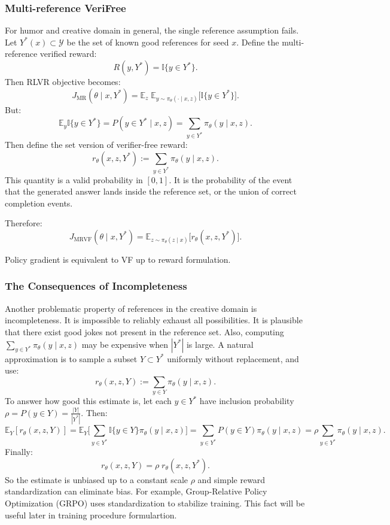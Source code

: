 \documentclass[12pt]{extarticle}
\begin{document}
\subsubsection{Multi-reference VeriFree}
For humor and creative domain in general, the single reference assumption fails. Let \(Y^{*}(x)\subset \mathcal{Y}\) be the set of known good references for seed \(x\). Define the multi-reference verified reward:
\[
  R(y, Y^{*}) = \mathbb{I}\{y\in Y^{*}\}.
\]
Then RLVR objective becomes:
\[
  J_{\text{MR}}(\theta\mid x,Y^{*}) = \mathbb{E}_{z}\;\mathbb{E}_{y\sim\pi_\theta(\cdot\mid x,z)}\big[\mathbb{I}\{y\in Y^{*}\}\big].
\]
But:
\[
  \mathbb{E}_{y}\mathbb{I}\{y\in Y^{*}\} = P(y\in Y^{*}\mid x,z)=\sum_{y\in Y^{*}}\pi_\theta(y\mid x,z).
\]
Then define the set version of verifier-free reward:
\[
  r_\theta(x,z,Y^{*}) := \sum_{y\in Y^{*}}\pi_\theta(y\mid x,z).
\]
This quantity is a valid probability in \([0,1]\). It is the probability of the event that the generated answer lands inside the reference set, or the union of correct completion events.

Therefore:
\[
  J_{\text{MRVF}}(\theta\mid x,Y^{*})=\mathbb{E}_{z\sim\pi_\theta(z\mid x)}\big[r_\theta(x,z,Y^{*})\big].
\]

Policy gradient is equivalent to VF up to reward formulation.

\subsubsection{The Consequences of Incompleteness}
Another problematic property of references in the creative domain is incompleteness. It is impossible to reliably exhaust all possibilities. It is plausible that there exist good jokes not present in the reference set. Also, computing \(\sum_{y\in Y^{*}}\pi_\theta(y\mid x,z)\) may be expensive when \(|Y^{*}|\) is large. A natural approximation is to sample a subset \(Y\subset Y^{*}\) uniformly without replacement, and use:
\[
  r_\theta(x,z,Y) := \sum_{y\in Y}\pi_\theta(y\mid x,z).
\]
To answer how good this estimate is, let each \(y\in Y^{*}\) have inclusion probability \(\rho=P(y\in Y)=\frac{|Y|}{|Y^{*}|}\). Then:
\[
  \mathbb{E}_Y[r_\theta(x,z,Y)]
  = \mathbb{E}_Y\Big[\sum_{y\in Y^{*}}\mathbb{I}\{y\in Y\}\pi_\theta(y\mid x,z)\Big]
  = \sum_{y\in Y^{*}}P(y\in Y)\pi_\theta(y\mid x,z)
  = \rho\sum_{y\in Y^{*}}\pi_\theta(y\mid x,z).
\]
Finally:
\[
  r_\theta(x,z,Y)=\rho\; r_\theta(x,z,Y^{*}).
\]
So the estimate is unbiased up to a constant scale \(\rho\) and simple reward standardization can eliminate  bias. For example, Group-Relative Policy Optimization (GRPO) uses standardization to stabilize training. This fact will be useful later in training procedure formulartion.
\end{document}
